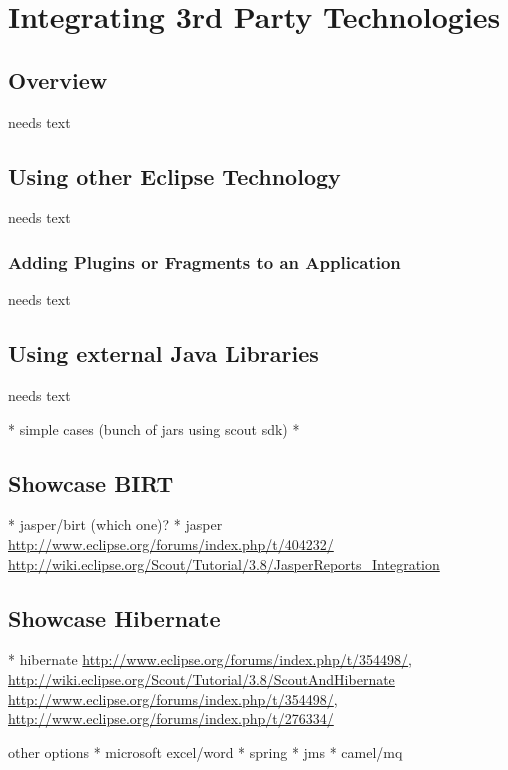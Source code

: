 \documentclass[a4paper,10pt,twoside]{book}
\begin{document}
  \sloppy
\fi


\chapter{Integrating 3rd Party Technologies}

\section{Overview}
needs text

\section{Using other Eclipse Technology}
needs text

\subsection{Adding Plugins or Fragments to an Application}
needs text

\section{Using external Java Libraries}
needs text

  * simple cases (bunch of jars using scout sdk)
  * 
  
\section{Showcase BIRT}
  * jasper/birt (which one)?
  * jasper \url{http://www.eclipse.org/forums/index.php/t/404232/} 
   \url{http://wiki.eclipse.org/Scout/Tutorial/3.8/JasperReports_Integration}
  
\section{Showcase Hibernate}  
* hibernate \url{http://www.eclipse.org/forums/index.php/t/354498/}, \url{http://wiki.eclipse.org/Scout/Tutorial/3.8/ScoutAndHibernate}
\url{http://www.eclipse.org/forums/index.php/t/354498/}, \url{http://www.eclipse.org/forums/index.php/t/276334/}

other options
  * microsoft excel/word
  * spring
  * jms
  * camel/mq
 
 
\ifx\wholebook\relax\else
   
   
\end{document}
